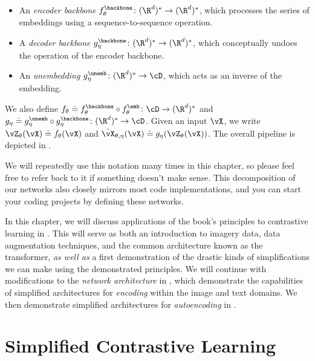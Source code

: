 \documentclass[../../book-main.tex]{subfiles}
\begin{document}
\begin{itemize}
\begin{itemize}
        \item An \textit{encoder backbone} \(f_{\theta}^{\backbone} \colon (\R^{d})^{*} \to (\R^{d})^{*}\), which processes the series of embeddings using a sequence-to-sequence operation.
        \item A \textit{decoder backbone} \(g_{\eta}^{\backbone} \colon (\R^{d})^{*} \to (\R^{d})^{*}\), which conceptually undoes the operation of the encoder backbone.
        \item An \textit{unembedding} \(g_{\eta}^{\unemb} \colon (\R^{d})^{*} \to \cD\), which acts as an inverse of the embedding.
    \end{itemize}
    We also define \(f_{\theta} \doteq f_{\theta}^{\backbone} \circ f_{\theta}^{\emb} \colon \cD \to (\R^{d})^{*}\) and \(g_{\eta} \doteq g_{\eta}^{\unemb} \circ g_{\eta}^{\backbone} \colon (\R^{d})^{*} \to \cD\). Given an input \(\vX\), we write \(\vZ_{\theta}(\vX) \doteq f_{\theta}(\vX)\) and \(\hat{\vX}_{\theta, \eta}(\vX) \doteq g_{\eta}(\vZ_{\theta}(\vX))\). The overall pipeline is depicted in .
\end{itemize}

We will repeatedly use this notation many times in this chapter, so please feel free to refer back to it if something doesn't make sense. This decomposition of our networks also closely mirrors most code implementations, and you can start your coding projects by defining these networks.

In this chapter, we will discuss applications of the book's principles to contrastive learning in . This will serve as both an introduction to imagery data, data augmentation techniques, and the common architecture known as the transformer, \textit{as well as} a first demonstration of the drastic kinds of simplifications we can make using the demonstrated principles. We will continue with modifications to the \textit{network architecture} in , which demonstrate the capabilities of simplified architectures for \textit{encoding} within the image and text domains. We then demonstrate simplified architectures for \textit{autoencoding} in . %


\section{Simplified Contrastive Learning}\label{sec:contrastive_learning}
\end{document}
